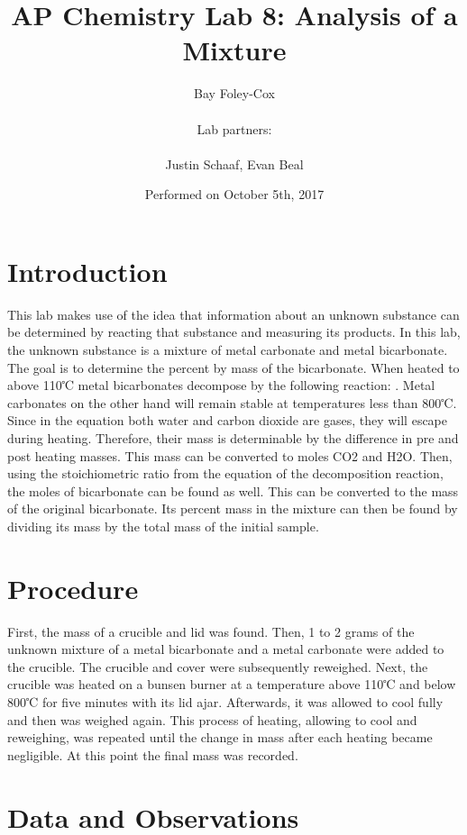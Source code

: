 \documentclass[titlepage][fleqn]{article}
\begin{document}
\title{AP Chemistry Lab 8: Analysis of a Mixture}
\author{Bay Foley-Cox \\\\ Lab partners: \\ \\Justin Schaaf, Evan Beal}
\date{Performed on October 5th, 2017}
\maketitle
\section{Introduction}
This lab makes use of the idea that information about an unknown substance can be determined by reacting that substance and measuring its products. In this lab, the unknown substance is a mixture of metal carbonate and metal bicarbonate. The goal is to determine the percent by mass of the bicarbonate. When heated to above 110℃ metal bicarbonates decompose by the following reaction:  . Metal carbonates on the other hand will remain stable at temperatures less than 800℃. Since in the equation both water and carbon dioxide are gases, they will escape during heating. Therefore, their mass is determinable by the difference in pre and post heating masses.  This mass can be converted to moles CO2 and H2O. Then, using the stoichiometric ratio from the equation of the decomposition reaction, the moles of bicarbonate can be found as well. This can be converted to the mass of the original bicarbonate. Its percent mass in the mixture can then be found by dividing its mass by the total mass of the initial sample. 

\section{Procedure}
First, the mass of a crucible and lid was found. Then, 1 to 2 grams of the unknown mixture of a metal bicarbonate and a metal carbonate were added to the crucible. The crucible and cover were subsequently reweighed. Next, the crucible was heated on a bunsen burner at a temperature above 110℃ and below 800℃ for five minutes with its lid ajar. Afterwards, it was allowed to cool fully and then was weighed again. This process of heating, allowing to cool and reweighing, was repeated until the change in mass after each heating became negligible. At this point the final mass was recorded.

\section{Data and Observations}
\end{document}
